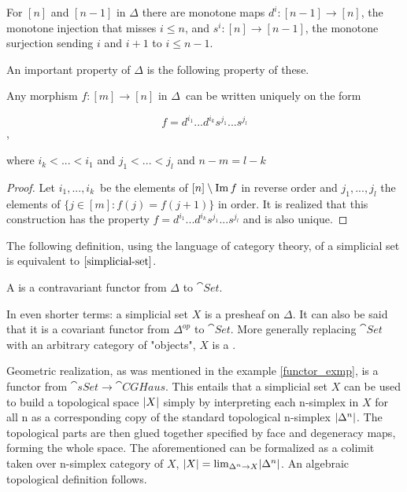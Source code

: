 \documentclass[../../main.tex]{subfiles}
\begin{document}
    For $[n]$ and $[n-1]$ in $\Delta$ there are monotone maps $d^i: [n-1] \to [n]$, the monotone injection that misses $i \leq n$, and $s^i: [n] \to [n-1]$, the monotone surjection sending $i$ and $i+1$ to $i \leq n-1$. 


    An important property of $\Delta$ is the following property of these.

    \begin{proposition}\label{uni-sim}
        Any morphism $f: [m] \to [n]$ in $\Delta$ can be written uniquely on the form

        \begin{equation*}
            f = d^{i_1}...d^{i_k}s^{j_1}...s^{j_l}
        \end{equation*},

        where $i_k < ... < i_1$ and $j_1 < ... < j_l$ and $n - m = l - k$
    \end{proposition}

    \begin{proof}
        Let $i_1, ..., i_k$ be the elements of $[n] \setminus \Ima f$ in reverse order and $j_1, ..., j_l$ the elements of $\{j \in [m]: f(j) = f(j+1)\}$ in order. It is realized that this construction has the property $f = d^{i_1}...d^{i_k}s^{j_1}...s^{j_l}$ and is also unique.
    \end{proof}

    The following definition, using the language of category theory, of a simplicial set is equivalent to $\ref{simplicial-set}$.

    \begin{definition}
        A  is a contravariant functor from $\Delta$ to $\cat{Set}$.
    \end{definition}

    In even shorter terms: a simplicial set $X$ is a presheaf on $\Delta$. It can also be said that it is a covariant functor from $\Delta^{op}$ to $\cat{Set}$. More generally replacing $\cat{Set}$ with an arbitrary category of "objects", $X$ is a .
    
    Geometric realization, as was mentioned in the example \ref{functor_exmp}, is a functor from $\cat{sSet}\to \cat{CGHaus}$. This entails that a simplicial set $X$ can be used to build a topological space $\geom[X]$ simply by interpreting each n-simplex in $X$ for all n as a corresponding copy of the standard topological n-simplex $\geom[\Delta^n]$. The topological parts are then glued together specified by face and degeneracy maps, forming the whole space. The aforementioned can be formalized as a colimit taken over n-simplex category of $X$, $\geom[X]= \lim_{\Delta^n\to X}\geom[\Delta^n]$. An algebraic topological definition follows.
\end{document}
